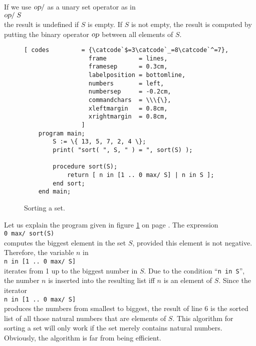 If we use $\textsl{op}\mathtt{/}$ as a unary set operator as in 
\\[0.2cm]
\hspace*{1.3cm}
$\textsl{op}\mathtt{/}\; S$
\\[0.2cm]
the result is undefined if $S$ is empty.  If $S$ is not empty, the result is computed by
putting the binary operator $\textsl{op}$ between all elements of $S$.


\begin{figure}[!ht]
  \centering
\begin{Verbatim}[ codes         = {\catcode`$=3\catcode`_=8\catcode`^=7},
                  frame         = lines, 
                  framesep      = 0.3cm, 
                  labelposition = bottomline,
                  numbers       = left,
                  numbersep     = -0.2cm,
                  commandchars  = \\\{\},
                  xleftmargin   = 0.8cm,
                  xrightmargin  = 0.8cm,
                ]
    program main;
        S := \{ 13, 5, 7, 2, 4 \};
        print( "sort( ", S, " ) = ", sort(S) );
    
        procedure sort(S);
            return [ n in [1 .. 0 max/ S] | n in S ];
        end sort;
    end main;
\end{Verbatim} 
\vspace*{-0.3cm}
\caption{Sorting a set.}  \label{fig:sort.stl}
\end{figure} %

Let us explain the program given in figure \ref{fig:sort.stl} on page
\pageref{fig:sort.stl}.
The expression 
\\[0.2cm]
\hspace*{1.3cm}
\texttt{0 max/ sort(S)}
\\[0.2cm]
computes the biggest element in the set $S$, provided this element is not negative.
Therefore, the variable $n$ in 
\\[0.2cm]
\hspace*{1.3cm}
\texttt{n in [1 .. 0 max/ S]}
\\[0.2cm]
iterates from  1 up to the biggest number in  $S$.  Due to the condition
 ``\texttt{n in S}'', the number  $n$ is inserted into the resulting list iff $n$ is an
 element of $S$.  Since the iterator 
\\[0.2cm]
\hspace*{1.3cm}
\texttt{n in [1 .. 0 max/ S]}
\\[0.2cm]
 produces the
 numbers from smallest to biggest,  the result of line 6 is the sorted list of all those
natural numbers that are elements of $S$.  This algorithm for sorting a set will only work
if the set merely contains natural numbers.  Obviously, the algorithm is far from
being efficient.

